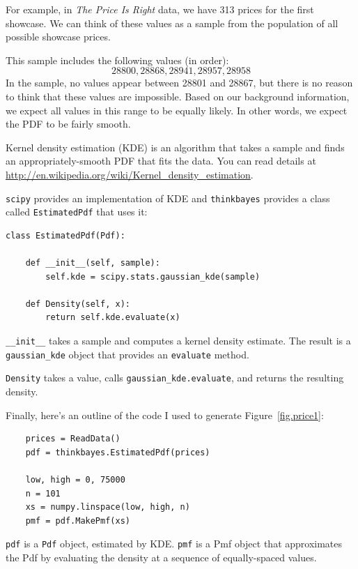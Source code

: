 \documentclass[12pt]{book}
\begin{document}
For example, in {\it The Price Is Right} data, we have
313 prices for the first showcase.  We can think of these
values as a sample from the population of all possible showcase
prices.

This sample includes the following values (in order):
%
\[ 28800, 28868, 28941, 28957, 28958 \]
%
In the sample, no values appear between 28801 and 28867, but
there is no reason to think that these values are impossible.
Based on our background information, we expect all
values in this range to be equally likely.  In other words,
we expect the PDF to be fairly smooth.

Kernel density estimation (KDE) is an algorithm that takes
a sample and finds an appropriately-smooth PDF that fits 
the data.  You can read details at
\url{http://en.wikipedia.org/wiki/Kernel_density_estimation}.

{\tt scipy} provides an implementation of KDE and  {\tt thinkbayes}
provides a class called {\tt EstimatedPdf} that 
uses it:

\begin{verbatim}
class EstimatedPdf(Pdf):

    def __init__(self, sample):
        self.kde = scipy.stats.gaussian_kde(sample)

    def Density(self, x):
        return self.kde.evaluate(x)
\end{verbatim}

\verb"__init__" takes a sample
and computes a kernel density estimate.  The result is a
\verb"gaussian_kde" object that provides an {\tt evaluate}
method.

{\tt Density} takes a value, calls \verb"gaussian_kde.evaluate",
and returns the resulting density.

Finally, here's an outline of the code I used to generate
Figure~\ref{fig.price1}:

\begin{verbatim}
    prices = ReadData()
    pdf = thinkbayes.EstimatedPdf(prices)

    low, high = 0, 75000
    n = 101
    xs = numpy.linspace(low, high, n) 
    pmf = pdf.MakePmf(xs)
\end{verbatim}

{\tt pdf} is a {\tt Pdf} object, estimated by KDE.  {\tt pmf}
is a Pmf object that approximates the Pdf by evaluating the density
at a sequence of equally-spaced values.
\end{document}
